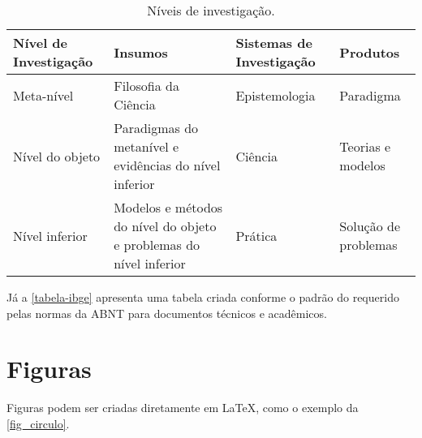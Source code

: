 \begin{table}[htb]
  \ABNTEXfontereduzida
  \caption[Níveis de investigação]{Níveis de investigação.}
  \label{tab-nivinv}
  \begin{tabular}{p{2.6cm}|p{6.0cm}|p{2.25cm}|p{3.40cm}}
     \textbf{Nível de Investigação} & \textbf{Insumos}  & \textbf{Sistemas de Investigação}  & \textbf{Produtos}  \\
      \hline
      Meta-nível & Filosofia\index{filosofia} da Ciência  & Epistemologia &
      Paradigma  \\
      \hline
      Nível do objeto & Paradigmas do metanível e evidências do nível inferior &
      Ciência  & Teorias e modelos \\
      \hline
      Nível inferior & Modelos e métodos do nível do objeto e problemas do nível inferior & Prática & Solução de problemas  \\
  \end{tabular}
\end{table}

Já a \autoref{tabela-ibge} apresenta uma tabela criada conforme o padrão do  requerido pelas normas da ABNT para documentos técnicos e acadêmicos.

\begin{table}[htb]
\end{table}


\section{Figuras}
Figuras podem ser criadas diretamente em \LaTeX, como o exemplo da \autoref{fig_circulo}.

